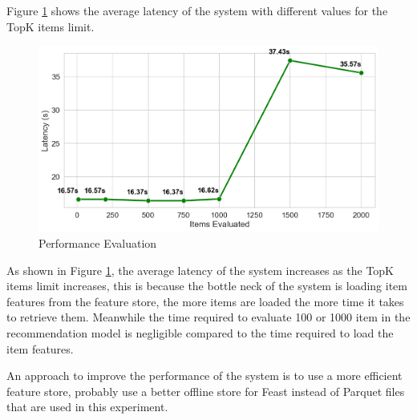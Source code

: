 Figure \ref{fig:PerformanceEvaluation} shows the average latency of the system with different values for the TopK items limit.

\begin{figure}[H]
    \centering
    \includegraphics[width=\textwidth]{assets/performance_benchmark.png}
    \caption{Performance Evaluation}
    \label{fig:PerformanceEvaluation}
\end{figure}

As shown in Figure \ref{fig:PerformanceEvaluation}, the average latency of the system increases as the TopK items limit increases, this is because the bottle neck of the system is loading item features from the feature store, the more items are loaded the more time it takes to retrieve them.
Meanwhile the time required to evaluate 100 or 1000 item in the recommendation model is negligible compared to the time required to load the item features.

An approach to improve the performance of the system is to use a more efficient feature store, probably use a better offline store for Feast instead of Parquet files that are used in this experiment.



